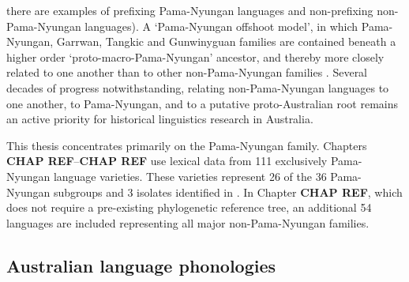 there are examples of prefixing Pama-Nyungan languages and non-prefixing non-Pama-Nyungan languages). A `Pama-Nyungan offshoot model', in which Pama-Nyungan, Garrwan, Tangkic and Gunwinyguan families are contained beneath a higher order `proto-macro-Pama-Nyungan' ancestor, and thereby more closely related to one another than to other non-Pama-Nyungan families \autocites{ogrady_preliminaries_1979}{evans_cradle_1997}{evans_enigma_1998}. Several decades of progress notwithstanding, relating non-Pama-Nyungan languages to one another, to Pama-Nyungan, and to a putative proto-Australian root remains an active priority for historical linguistics research in Australia.

This thesis concentrates primarily on the Pama-Nyungan family. Chapters \textbf{CHAP REF}--\textbf{CHAP REF} use lexical data from 111 exclusively Pama-Nyungan language varieties. These varieties represent 26 of the 36 Pama-Nyungan subgroups and 3 isolates identified in \textcite{bowern_pama-nyungan_2018}. In Chapter \textbf{CHAP REF}, which does not require a pre-existing phylogenetic reference tree, an additional 54 languages are included representing all major non-Pama-Nyungan families.

\hypertarget{australian-language-phonologies}{%
\subsection{Australian language phonologies}\label{australian-language-phonologies}}

